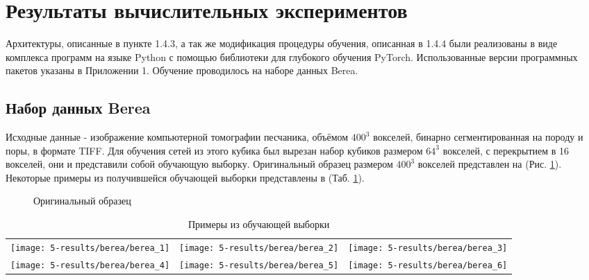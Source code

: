 \clearpage
\section{Результаты вычислительных экспериментов}
	Архитектуры, описанные в пункте 1.4.3, а так же модификация процедуры обучения, описанная в 1.4.4 были реализованы в виде комплекса программ на языке Python с помощью библиотеки для глубокого обучения PyTorch. Использованные версии программных пакетов указаны в Приложении 1. Обучение проводилось на наборе данных Berea.
	\subsection{Набор данных Berea}
		Исходные данные - изображение компьютерной томографии песчаника, объёмом $400^3$ вокселей, бинарно сегментированная на породу и поры, в формате TIFF. Для обучения сетей из этого кубика был вырезан набор кубиков размером $64^3$ вокселей, с перекрытием в 16 вокселей, они и представили собой обучающую выборку. Оригинальный образец размером $400^3$ вокселей представлен на (Рис. \ref{5-full-berea}). Некоторые примеры из получившейся обучающей выборки представлены в (Таб. \ref{5-berea64}).
		
		\begin{figure}[h!]
			\caption{Оригинальный образец}
			\label{5-full-berea}
		\end{figure}
	
		\begin{table}[h!]
			\begin{center}
				\begin{tabular}{p{5cm} p{5cm} p{5cm}}
					\toprule
					\texttt{[image: 5-results/berea/berea\_1]}
					&
					\texttt{[image: 5-results/berea/berea\_2]}
					&
					\texttt{[image: 5-results/berea/berea\_3]}
					\\
					\texttt{[image: 5-results/berea/berea\_4]}
					&
					\texttt{[image: 5-results/berea/berea\_5]}
					&
					\texttt{[image: 5-results/berea/berea\_6]}
					\\
					\bottomrule
				\end{tabular}
				\caption{Примеры из обучающей выборки}
				\label{5-berea64}
			\end{center}
		\end{table}
